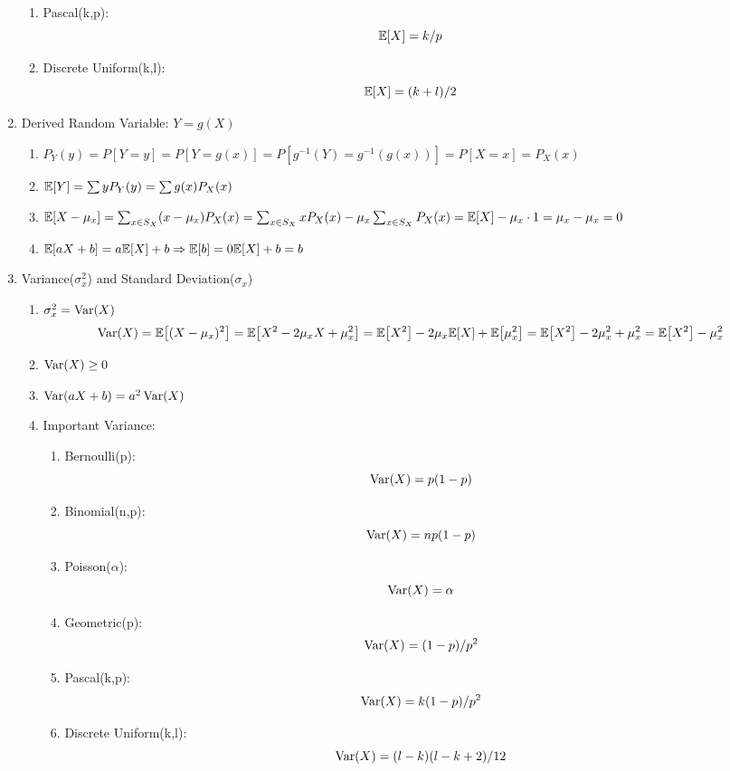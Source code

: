 \begin{enumerate}
{\begin{enumerate}
{\begin{enumerate}
{\begin{enumerate}
                            \item Pascal(k,p): $$\E{X}=k/p$$
                            \item Discrete Uniform(k,l): $$\E{X}=(k+l)/2$$
                        \end{enumerate}
                    }
                \end{enumerate}
            }
        \end{enumerate}
    }
    \item Derived Random Variable: $Y = g(X)${
        \begin{enumerate}
            \item $P_Y(y) = P[Y=y] = P[Y=g(x)] = P[g^{-1}(Y)=g^{-1}(g(x))] = P[X=x] = P_X(x)$
            \item $\E{Y} = \sum yP_Y(y) = \sum g(x)P_X(x)$
            \item $\E{X-\mu_x}=\sum_{x\in S_X}(x-\mu_x)P_X(x)=\sum_{x\in S_X}xP_X(x)-\mu_x\sum_{x\in S_X}P_X(x)=\E{X}-\mu_x\cdot 1=\mu_x-\mu_x=0$
            \item $\E{aX+b}=a\E{X}+b \Rightarrow \E{b}=0\E{X}+b=b$
        \end{enumerate}
    }
    \item Variance($\sigma_x^2$) and Standard Deviation($\sigma_x$){
        \begin{enumerate}
            \item $\sigma_x^2=\mathop{\mathrm{Var}}\nolimits(X)$ $$\Var(X)=\E{(X-\mu_x)^2}=\E{X^2-2\mu_xX+\mu_x^2}=\E{X^2}-2\mu_x\E{X}+\E{\mu_x^2}=\E{X^2}-2\mu_x^2+\mu_x^2=\E{X^2}-\mu_x^2$$
            \item $\mathop{\mathrm{Var}}\nolimits(X)\geq 0$
            \item $\mathop{\mathrm{Var}}\nolimits(aX+b)=a^2\mathop{\mathrm{Var}}\nolimits(X)$
            \item Important Variance:{
                \begin{enumerate}
                    \item Bernoulli(p): $$\mathop{\mathrm{Var}}\nolimits(X)=p(1-p)$$
                    \item Binomial(n,p): $$\mathop{\mathrm{Var}}\nolimits(X)=np(1-p)$$
                    \item Poisson($\alpha$): $$\mathop{\mathrm{Var}}\nolimits(X)=\alpha$$
                    \item Geometric(p): $$\mathop{\mathrm{Var}}\nolimits(X)=(1-p)/p^2$$
                    \item Pascal(k,p): $$\mathop{\mathrm{Var}}\nolimits(X)=k(1-p)/p^2$$
                    \item Discrete Uniform(k,l): $$\mathop{\mathrm{Var}}\nolimits(X)=(l-k)(l-k+2)/12$$
                \end{enumerate}
            }
        \end{enumerate}
    }
\end{enumerate}